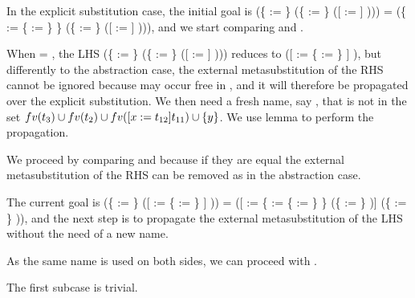 \begin{coqdoccode}
\end{coqdoccode}
In the explicit substitution case, the initial goal is (\{ := \} (\{ := \} ([ := ] ))) = (\{ := \{ := \} \} (\{ := \} ([ := ] ))), and we start comparing  and . \begin{coqdoccode}
 \end{coqdoccode}
When  = , the LHS (\{ := \} (\{ := \} ([ := ] ))) reduces to ([ := \{ := \} ] ), but differently to the abstraction case, the external metasubstitution of the RHS cannot be ignored because  may occur free in , and it will therefore be propagated over the explicit substitution. We then need a fresh name, say , that is not in the set $fv(t_3)\cup fv(t_2) \cup fv(\esub{t_{11}}{x}{t_{12}}) \cup \{y\}$. We use lemma  to perform the propagation.\begin{coqdoccode}
 \end{coqdoccode}
We proceed by comparing  and  because if they are equal the external metasubstitution of the RHS can be removed as in the abstraction case.
\begin{coqdoccode}
\end{coqdoccode}
The current goal is (\{ := \} ([ := \{ := \} ] )) = ([ := \{ := \{ := \} \} (\{ := \} )] (\{ := \} )), and the next step is to propagate the external metasubstitution of the LHS without the need of a new name.
\begin{coqdoccode}
\end{coqdoccode}
As the same name  is used on both sides, we can proceed with . 
\begin{coqdoccode}
\end{coqdoccode}
The first subcase is trivial.
\begin{coqdoccode}
\end{coqdoccode}
